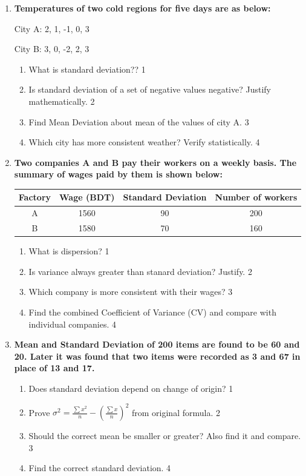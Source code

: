 \documentclass[a4paper,oneside]{book}
\begin{document}
\begin{enumerate}
    \item
  \textbf{Temperatures of two cold regions for five days are as below:}

    City A: 2, 1, -1, 0, 3

    City B: 3, 0, -2, 2, 3
  \begin{enumerate}
    \item
	What is standard deviation?? \hfill 1
    \item
	Is standard deviation of a set of negative values negative? Justify mathematically. \hfill 2
    \item  
	Find Mean Deviation about mean of the values of city A.  \hfill 3
    \item
	Which city has more consistent weather? Verify statistically. \hfill 4
\end{enumerate}

 \item
	  \textbf{Two companies A and B pay their workers on a weekly basis. The summary of wages paid by them is shown below:} 
	  
	  \begin{table}[h]
	  \centering
\begin{tabular}{c|ccc}
Factory & Wage (BDT) & Standard Deviation & Number of workers \\ \hline
A       & 1560       & 90                 & 200               \\ 
B       & 1580       & 70                 & 160              
\end{tabular}
\end{table}
  
  \begin{enumerate}
    \item
	What is dispersion? \hfill 1
    \item
	Is variance always greater than stanard deviation? Justify. \hfill 2
    \item  
	Which company is more consistent with their wages? \hfill 3
    \item
	Find the combined Coefficient of Variance (CV) and compare with individual companies. \hfill 4
  \end{enumerate}
  

 \item
	  \textbf{Mean and Standard Deviation of 200 items are found to be 60 and 20. Later it was found that two items were recorded as 3 and 67 in place of 13 and 17.} 
  
  \begin{enumerate}
    \item
	Does standard deviation depend on change of origin? \hfill 1
    \item
	Prove $\displaystyle \sigma^2 = \frac{\sum x^2}n -(\frac{\sum x}{n})^2$ from original formula. \hfill 2
    \item  
	Should the correct mean be smaller or greater? Also find it and compare.  \hfill 3
    \item
	Find the correct standard deviation. \hfill 4
  \end{enumerate}

\end{enumerate}
\end{document}
